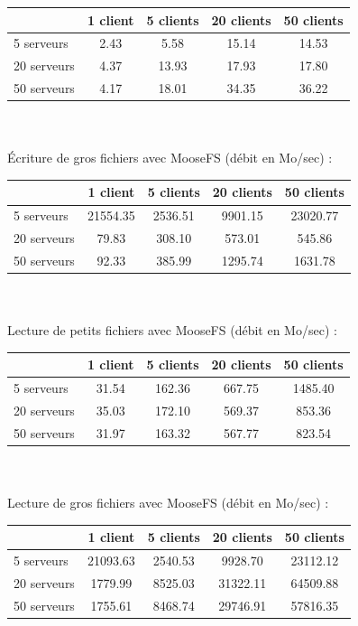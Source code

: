 \documentclass[12pt]{report}
\begin{document}
			\begin{tabular}{|l|c|c|c|c|}
				\hline
				& 1 client & 5 clients & 20 clients & 50 clients \\
				\hline
				5 serveurs & 2.43 & 5.58 & 15.14 & 14.53 \\
				\hline
				20 serveurs & 4.37 & 13.93 & 17.93 & 17.80 \\
				\hline
				50 serveurs & 4.17 & 18.01 & 34.35 & 36.22 \\
				\hline
			\end{tabular}\\\\

			Écriture de gros fichiers avec MooseFS (débit en Mo/sec) :

			\begin{tabular}{|l|c|c|c|c|}
				\hline
				& 1 client & 5 clients & 20 clients & 50 clients \\
				\hline
				5 serveurs & 21554.35 & 2536.51 & 9901.15 & 23020.77 \\
				\hline
				20 serveurs & 79.83 & 308.10 & 573.01 & 545.86 \\
				\hline
				50 serveurs & 92.33 & 385.99 & 1295.74 & 1631.78 \\
				\hline
			\end{tabular}\\\\

			Lecture de petits fichiers avec MooseFS (débit en Mo/sec) :

			\begin{tabular}{|l|c|c|c|c|}
				\hline
				& 1 client & 5 clients & 20 clients & 50 clients \\
				\hline
				5 serveurs & 31.54 & 162.36 & 667.75 & 1485.40 \\
				\hline
				20 serveurs & 35.03 & 172.10 & 569.37 & 853.36 \\
				\hline
				50 serveurs & 31.97 & 163.32 & 567.77 & 823.54 \\
				\hline
			\end{tabular}\\\\

			Lecture de gros fichiers avec MooseFS (débit en Mo/sec) :

			\begin{tabular}{|l|c|c|c|c|}
				\hline
				& 1 client & 5 clients & 20 clients & 50 clients \\
				\hline
				5 serveurs & 21093.63 & 2540.53 & 9928.70 & 23112.12 \\
				\hline
				20 serveurs & 1779.99 & 8525.03 & 31322.11 & 64509.88 \\
				\hline
				50 serveurs & 1755.61 & 8468.74 & 29746.91 & 57816.35 \\
				\hline
			\end{tabular}
\end{document}
